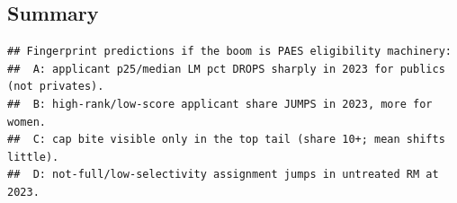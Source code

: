 \documentclass[
]{article}
\begin{document}
\hypertarget{summary}{%
\subsection{Summary}\label{summary}}

\begin{verbatim}
## Fingerprint predictions if the boom is PAES eligibility machinery:
##  A: applicant p25/median LM pct DROPS sharply in 2023 for publics (not privates).
##  B: high-rank/low-score applicant share JUMPS in 2023, more for women.
##  C: cap bite visible only in the top tail (share 10+; mean shifts little).
##  D: not-full/low-selectivity assignment jumps in untreated RM at 2023.
\end{verbatim}
\end{document}
